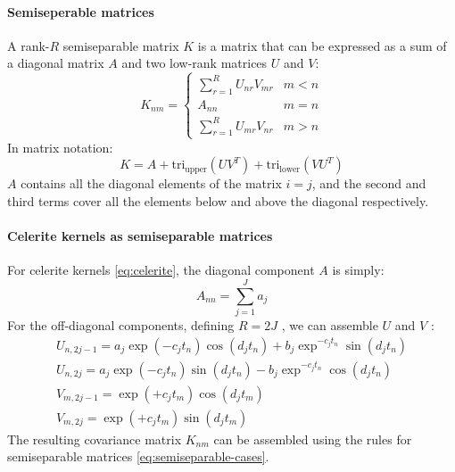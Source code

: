 \paragraph{Semiseperable matrices}
A rank-$R$ semiseparable matrix $K$ is a matrix that can be expressed as a sum of a diagonal matrix $A$ and two low-rank matrices $U$ and $V$:
\begin{equation} \label{eq:semiseparable-cases}
    K_{nm} = \begin{cases}
        \sum_{r=1}^R U_{nr} V_{mr} & m < n \\
        A_{nn} & m = n \\
        \sum_{r=1}^R U_{mr} V_{nr} & m > n
    \end{cases}
\end{equation}
In matrix notation:
\begin{equation} \label{eq:semiseparable-matrix}
    K = A + \text{tri}_{\text{upper}}(U V^T) + \text{tri}_{\text{lower}}(V U^T)
\end{equation}
$A$ contains all the diagonal elements of the matrix $i = j$, and the second and third terms cover all the elements below and above the diagonal respectively.

\paragraph{Celerite kernels as semiseparable matrices}
For celerite kernels \ref{eq:celerite}, the diagonal component $A$ is simply:
\begin{equation*}
    A_{nn} = \sum_{j=1}^J a_j
\end{equation*} \cite{foreman-mackay}
For the off-diagonal components, defining $R = 2J$ , we can assemble $U$ and $V$ \cite{foreman-mackay}:
\begin{equation*}
    \begin{aligned}
        U_{n, 2j-1} = a_j \exp (-c_j t_n) \cos(d_j t_n) + b_j \exp^{-c_j t_n} \sin(d_j t_n) \\
        U_{n, 2j} = a_j \exp (-c_j t_n) \sin(d_j t_n) - b_j \exp^{-c_j t_n} \cos(d_j t_n) \\
        V_{m, 2j-1} = \exp (+c_j t_m) \cos(d_j t_m) \\
        V_{m, 2j} = \exp (+c_j t_m) \sin(d_j t_m)
    \end{aligned}
\end{equation*} 
The resulting covariance matrix $K_{nm}$ can be assembled using the rules for semiseparable matrices \ref{eq:semiseparable-cases}. 

